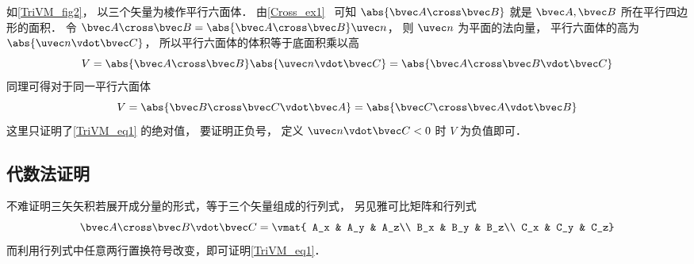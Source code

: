 如\autoref{TriVM_fig2}， 以三个矢量为棱作平行六面体． 由\autoref{Cross_ex1}~ 可知 $\abs{\bvec A \cross \bvec B}$ 就是 $\bvec A,\bvec B$ 所在平行四边形的面积． 令 $\bvec A \cross \bvec B = \abs{\bvec A \cross \bvec B} \uvec n$， 则 $\uvec n$ 为平面的法向量， 平行六面体的高为 $\abs{\uvec n \vdot \bvec C}$， 所以平行六面体的体积等于底面积乘以高
\begin{equation}
V = \abs{\bvec A \cross \bvec B} \abs{\uvec n \vdot \bvec C} = \abs{\bvec A \cross \bvec B \vdot \bvec C}
\end{equation}
同理可得对于同一平行六面体
\begin{equation}
V = \abs{\bvec B \cross \bvec C \vdot \bvec A} = \abs{\bvec C \cross \bvec A \vdot \bvec B} 
\end{equation}  
这里只证明了\autoref{TriVM_eq1} 的绝对值， 要证明正负号， 定义 $\uvec n \vdot \bvec C < 0$ 时 $V$ 为负值即可．

\subsection{代数法证明}
不难证明三矢矢积若展开成分量的形式，等于三个矢量组成的行列式， 另见雅可比矩阵和行列式
\begin{equation}
\bvec A \cross \bvec B \vdot \bvec C = \vmat{
A_x & A_y & A_z\\
B_x & B_y & B_z\\
C_x & C_y & C_z}
\end{equation}
而利用行列式中任意两行置换符号改变，即可证明\autoref{TriVM_eq1}．
